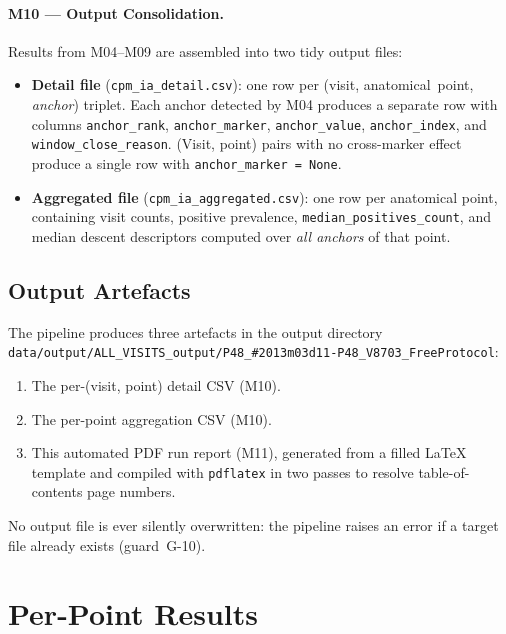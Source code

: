 \documentclass[a4paper,11pt]{article}
\begin{document}
\paragraph{M10 --- Output Consolidation.}
Results from M04--M09 are assembled into two tidy output files:
\begin{itemize}
  \item \textbf{Detail file} (\texttt{cpm\_ia\_detail.csv}): one row per
        (visit, anatomical~point, \emph{anchor}) triplet. Each anchor detected by M04
        produces a separate row with columns \texttt{anchor\_rank},
        \texttt{anchor\_marker}, \texttt{anchor\_value}, \texttt{anchor\_index},
        and \texttt{window\_close\_reason}.
        (Visit, point) pairs with no cross-marker effect produce a single row with
        \texttt{anchor\_marker = None}.
  \item \textbf{Aggregated file} (\texttt{cpm\_ia\_aggregated.csv}): one row per
        anatomical point, containing visit counts, positive prevalence,
        \texttt{median\_positives\_count}, and median descent descriptors computed over
        \emph{all anchors} of that point.
\end{itemize}

\subsection{Output Artefacts}

The pipeline produces three artefacts in the output directory \texttt{data/output/ALL\_VISITS\_output/P48\_\#2013m03d11-P48\_V8703\_FreeProtocol}:
\begin{enumerate}
  \item The per-(visit, point) detail CSV (M10).
  \item The per-point aggregation CSV (M10).
  \item This automated PDF run report (M11), generated from a filled \LaTeX{} template
        and compiled with \texttt{pdflatex} in two passes to resolve table-of-contents
        page numbers.
\end{enumerate}
No output file is ever silently overwritten: the pipeline raises an error if a target
file already exists (guard~G-10).

\section{Per-Point Results}
\end{document}
